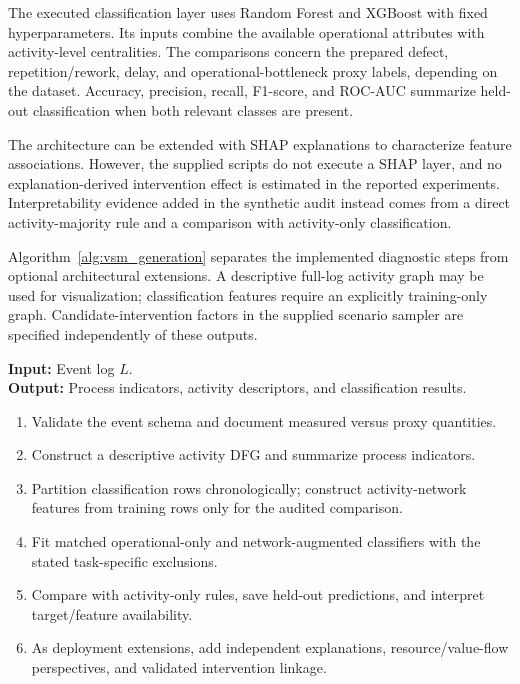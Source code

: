 \documentclass[pdflatex,iicol,Numbered,sn-basic]{sn-jnl}
\begin{document}
The executed classification layer uses Random Forest and XGBoost with fixed hyperparameters. Its inputs combine the available operational attributes with activity-level centralities. The comparisons concern the prepared defect, repetition/rework, delay, and operational-bottleneck proxy labels, depending on the dataset. Accuracy, precision, recall, F1-score, and ROC-AUC summarize held-out classification when both relevant classes are present.

The architecture can be extended with SHAP explanations to characterize feature associations. However, the supplied scripts do not execute a SHAP layer, and no explanation-derived intervention effect is estimated in the reported experiments. Interpretability evidence added in the synthetic audit instead comes from a direct activity-majority rule and a comparison with activity-only classification.

Algorithm~\ref{alg:vsm_generation} separates the implemented diagnostic steps from optional architectural extensions. A descriptive full-log activity graph may be used for visualization; classification features require an explicitly training-only graph. Candidate-intervention factors in the supplied scenario sampler are specified independently of these outputs.

\begin{algorithm}[!t]
\caption{Implemented diagnostic steps and proposed extensions}
\label{alg:vsm_generation}
\textbf{Input:} Event log \(L\).\\
\textbf{Output:} Process indicators, activity descriptors, and classification results.
\begin{enumerate}
\item Validate the event schema and document measured versus proxy quantities.
\item Construct a descriptive activity DFG and summarize process indicators.
\item Partition classification rows chronologically; construct activity-network features from training rows only for the audited comparison.
\item Fit matched operational-only and network-augmented classifiers with the stated task-specific exclusions.
\item Compare with activity-only rules, save held-out predictions, and interpret target/feature availability.
\item As deployment extensions, add independent explanations, resource/value-flow perspectives, and validated intervention linkage.
\end{enumerate}
\end{algorithm}
\end{document}
